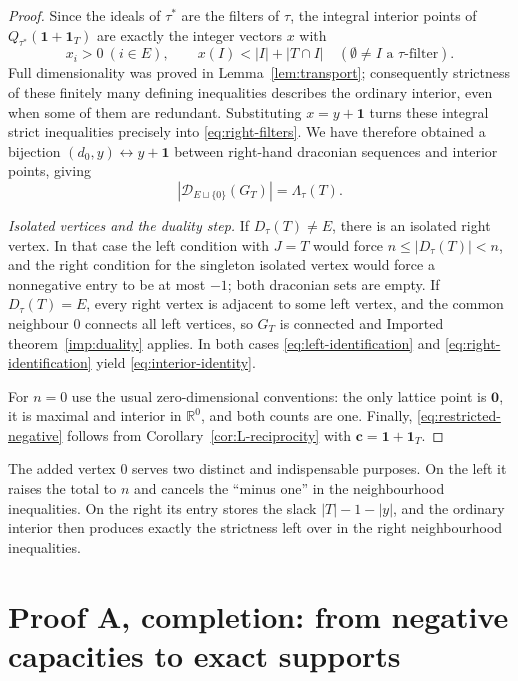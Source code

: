 \documentclass[11pt]{article}
\numberwithin{equation}{section}
\theoremstyle{definition}
\theoremstyle{remark}
\newcommand{\R}{\mathbb R}
\newcommand{\one}{\mathbf 1}
\newcommand{\zero}{\mathbf 0}
\newcommand{\Dr}{\mathcal D}
\begin{document}
\begin{proof}
Since the ideals of $\tau^*$ are the filters of $\tau$, the integral interior
points of $Q_{\tau^*}(\one+\one_T)$ are exactly the integer vectors $x$ with
\[
 x_i>0\ (i\in E),\qquad
 x(I)<|I|+|T\cap I|\quad(\emptyset\ne I\text{ a $\tau$-filter}).
\]
Full dimensionality was proved in Lemma~\ref{lem:transport}; consequently
strictness of these finitely many defining inequalities describes the ordinary
interior, even when some of them are redundant. Substituting $x=y+\one$ turns
these integral strict inequalities precisely into \eqref{eq:right-filters}. We
have therefore obtained a bijection $(d_0,y)\leftrightarrow y+\one$ between
right-hand draconian sequences and interior points, giving
\begin{equation}
 |\Dr_{E\sqcup\{0\}}(G_T)|=\Lambda_\tau(T).
 \label{eq:right-identification}
\end{equation}

\smallskip\noindent\emph{Isolated vertices and the duality step.}
If $D_\tau(T)\ne E$, there is an isolated right vertex. In that case the left
condition with $J=T$ would force $n\le|D_\tau(T)|<n$, and the right condition
for the singleton isolated vertex would force a nonnegative entry to be at
most $-1$; both draconian sets are empty. If $D_\tau(T)=E$, every right vertex
is adjacent to some left vertex, and the common neighbour $0$ connects all
left vertices, so $G_T$ is connected and Imported theorem~\ref{imp:duality}
applies. In both cases \eqref{eq:left-identification} and
\eqref{eq:right-identification} yield \eqref{eq:interior-identity}.

For $n=0$ use the usual zero-dimensional conventions: the only lattice point
is $\zero$, it is maximal and interior in $\R^0$, and both counts are one.
Finally, \eqref{eq:restricted-negative} follows from
Corollary~\ref{cor:L-reciprocity} with $\mathbf c=\one+\one_T$.
\end{proof}

The added vertex $0$ serves two distinct and indispensable purposes. On the
left it raises the total to $n$ and cancels the ``minus one'' in the
neighbourhood inequalities. On the right its entry stores the slack
$|T|-1-|y|$, and the ordinary interior then produces exactly the strictness
left over in the right neighbourhood inequalities.

\section{Proof A, completion: from negative capacities to exact supports}
\label{sec:completion}
\end{document}
